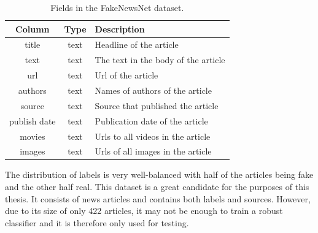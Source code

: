 \begin{table}[H]
    \centering
    \begin{tabular}{c|c|l}
    \textbf{Column} & \cellcolor[HTML]{FFFFFF}\textbf{Type} & \cellcolor[HTML]{FFFFFF}\textbf{Description} \\ \hline
    title        & text & Headline of the article             \\
    text         & text & The text in the body of the article \\
    url          & text & Url of the article                  \\
    authors      & text & Names of authors of the article     \\
    source       & text & Source that published the article   \\
    publish date & text & Publication date of the article     \\
    movies       & text & Urls to all videos in the article   \\
    images       & text & Urls of all images in the article  
    \end{tabular}
    \caption{Fields in the FakeNewsNet dataset.}
    \label{tab:fakenewsnet}
\end{table}

The distribution of labels is very well-balanced with half of the articles being fake and the other half real. This dataset is a great candidate for the purposes of this thesis. It consists of news articles and contains both labels and sources. However, due to its size of only 422 articles, it may not be enough to train a robust classifier and it is therefore only used for testing.


